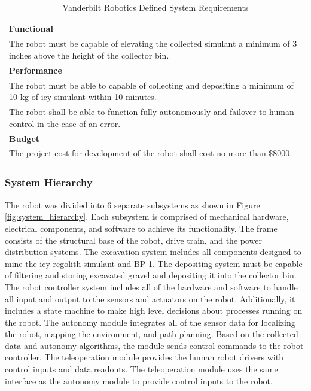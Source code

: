 \documentclass[class=article, crop=false]{standalone}
\begin{document}
	\FloatBarrier
	\begin{table}[h]
	\footnotesize
	\centering
	\begin{tabular}{ | m{38em} | } 
 	\hline
 		\textbf{Functional} \\ 
 		\hline
 		The robot must be capable of elevating the collected simulant a minimum of 3 inches above the height of the collector bin. \\ 
 		\hline
 		\textbf{Performance} \\ 
 		\hline
 		The robot must be able to capable of collecting and depositing a minimum of 10 kg of icy simulant within 10 minutes. \\
 		\hline
 		The robot shall be able to function fully autonomously and failover to human control in the case of an error. \\
 		\hline
 		\textbf{Budget} \\
 		\hline
		The project cost for development of the robot shall cost no more than \$8000. \\

 	\hline
 		
	\end{tabular}
	\caption{Vanderbilt Robotics Defined System Requirements}
		\label{table:vur_requirements}
	\end{table}
	\FloatBarrier
	
	\subsubsection{System Hierarchy}
	 The robot was divided into 6 separate subsystems as shown in Figure \ref{fig:system_hierarchy}. Each subsystem is comprised of mechanical hardware, electrical components, and software to achieve its functionality. The frame consists of the structural base of the robot, drive train, and the power distribution systems. The excavation system includes all components designed to mine the icy regolith simulant and BP-1. The depositing system must be capable of filtering and storing excavated gravel and depositing it into the collector bin. The robot controller system includes all of the hardware and software to handle all input and output to the sensors and actuators on the robot. Additionally, it includes a state machine to make high level decisions about processes running on the robot. The autonomy module integrates all of the sensor data for localizing the robot, mapping the environment, and path planning. Based on the collected data and autonomy algorithms, the module sends control commands to the robot controller. The teleoperation module provides the human robot drivers with control inputs and data readouts. The teleoperation module uses the same interface as the autonomy module to provide control inputs to the robot.
\end{document}
